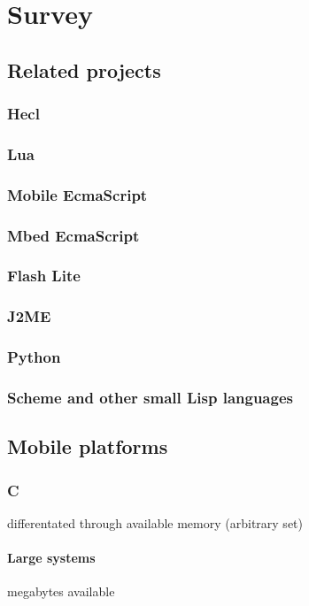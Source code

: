 \chapter{Survey}

\section{Related projects}
\subsection{Hecl}
\subsection{Lua}
\subsection{Mobile EcmaScript}
\subsection{Mbed EcmaScript}
\subsection{Flash Lite}
\subsection{J2ME}
\subsection{Python}
\subsection{Scheme and other small Lisp languages}

\section{Mobile platforms}


\subsection{C}
differentated through available memory (arbitrary set)
\subsubsection{Large systems}
megabytes available 

